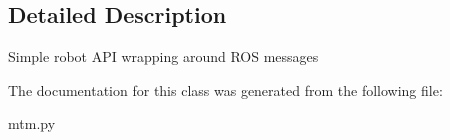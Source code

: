 \subsection{Detailed Description}
\begin{DoxyVerb}Simple robot API wrapping around ROS messages
\end{DoxyVerb}
 

The documentation for this class was generated from the following file\-:\begin{DoxyCompactItemize}
\item 
mtm.\-py\end{DoxyCompactItemize}
